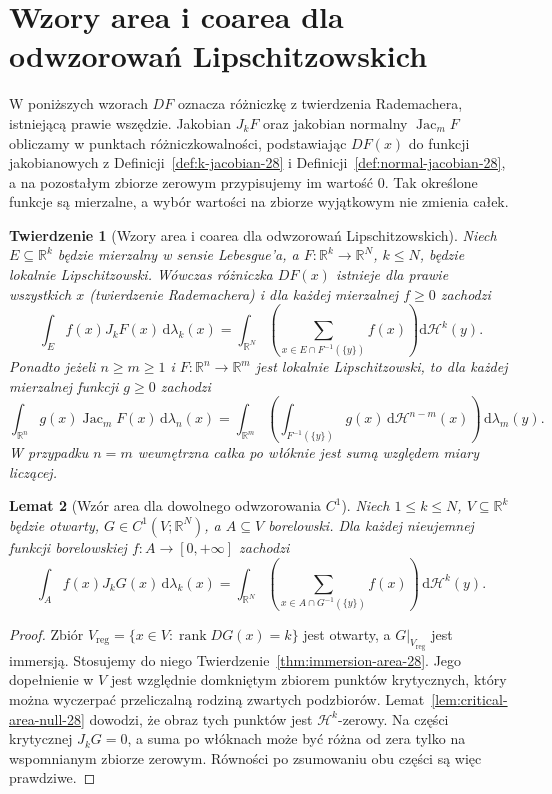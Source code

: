 \documentclass[11pt,a4paper,oneside]{book}
\numberwithin{equation}{chapter}
\theoremstyle{plain}
\newtheorem{twierdzenie}{Twierdzenie}[chapter]
\newtheorem{lemat}[twierdzenie]{Lemat}
\theoremstyle{definition}
\theoremstyle{remark}
\begin{document}
\section{Wzory area i coarea dla odwzorowań Lipschitzowskich}
W poniższych wzorach $DF$ oznacza różniczkę z twierdzenia
Rademachera, istniejącą prawie wszędzie. Jakobian $J_kF$
oraz jakobian normalny $\operatorname{Jac}_mF$ obliczamy
w punktach różniczkowalności, podstawiając $DF(x)$
do funkcji jakobianowych z
Definicji~\ref{def:k-jacobian-28} i
Definicji~\ref{def:normal-jacobian-28},
a na pozostałym zbiorze zerowym przypisujemy im wartość $0$.
Tak określone funkcje są mierzalne, a wybór wartości
na zbiorze wyjątkowym nie zmienia całek.
\begin{twierdzenie}[Wzory area i coarea dla odwzorowań Lipschitzowskich]
\label{thm:lipschitz-area-coarea-28}
Niech $E\subseteq\mathbb R^k$ będzie mierzalny
w sensie Lebesgue'a, a $F:\mathbb R^k\to\mathbb R^N$,
$k\le N$, będzie lokalnie Lipschitzowski.
Wówczas różniczka $DF(x)$ istnieje dla prawie
wszystkich $x$ (twierdzenie Rademachera)
i dla każdej mierzalnej $f\ge0$ zachodzi
\[
 \int_E f(x)J_kF(x)\,\mathrm d\lambda_k(x)
 =\int_{\mathbb R^N}\left(\sum_{x\in E\cap F^{-1}(\{y\})}
 f(x)\right)\mathrm d\mathcal H^k(y).
\]
Ponadto jeżeli $n\ge m\ge1$ i
$F:\mathbb R^n\to\mathbb R^m$ jest lokalnie
Lipschitzowski, to dla każdej mierzalnej
funkcji $g\ge0$ zachodzi
\[
 \int_{\mathbb R^n}g(x)\operatorname{Jac}_mF(x)
 \,\mathrm d\lambda_n(x)
 =\int_{\mathbb R^m}\left(
 \int_{F^{-1}(\{y\})}g(x)
 \,\mathrm d\mathcal H^{n-m}(x)\right)
 \,\mathrm d\lambda_m(y).
\]
W przypadku $n=m$ wewnętrzna całka po włóknie
jest sumą względem miary liczącej.
\end{twierdzenie}

\begin{lemat}[Wzór area dla dowolnego odwzorowania $C^1$]
\label{lem:c1-general-area-28}
Niech $1\le k\le N$, $V\subseteq\mathbb R^k$ będzie
otwarty, $G\in C^1(V;\mathbb R^N)$, a $A\subseteq V$
borelowski. Dla każdej nieujemnej funkcji borelowskiej
$f:A\to[0,+\infty]$ zachodzi
\[
 \int_Af(x)J_kG(x)\,\mathrm d\lambda_k(x)
 =\int_{\mathbb R^N}\left(
 \sum_{x\in A\cap G^{-1}(\{y\})}f(x)\right)
 \,\mathrm d\mathcal H^k(y).
\]
\end{lemat}
\begin{proof}
Zbiór $V_{\mathrm{reg}}=\{x\in V:\operatorname{rank}DG(x)=k\}$
jest otwarty, a $G|_{V_{\mathrm{reg}}}$ jest immersją.
Stosujemy do niego
Twierdzenie~\ref{thm:immersion-area-28}.
Jego dopełnienie w $V$ jest względnie domkniętym
zbiorem punktów krytycznych, który można wyczerpać
przeliczalną rodziną zwartych podzbiorów.
Lemat~\ref{lem:critical-area-null-28} dowodzi, że obraz
tych punktów jest $\mathcal H^k$-zerowy.
Na części krytycznej $J_kG=0$, a suma po włóknach
może być różna od zera tylko na wspomnianym
zbiorze zerowym. Równości po zsumowaniu obu
części są więc prawdziwe.
\end{proof}
\end{document}
